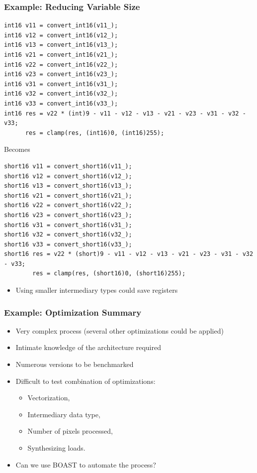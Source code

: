 \documentclass{beamer}
\begin{document}
\begin{frame}[fragile]
  \frametitle{Example: Reducing Variable Size}
\lstset{style=BC}
\begin{lstlisting}
int16 v11 = convert_int16(v11_);
int16 v12 = convert_int16(v12_);
int16 v13 = convert_int16(v13_);
int16 v21 = convert_int16(v21_);
int16 v22 = convert_int16(v22_);
int16 v23 = convert_int16(v23_);
int16 v31 = convert_int16(v31_);
int16 v32 = convert_int16(v32_);
int16 v33 = convert_int16(v33_);
int16 res = v22 * (int)9 - v11 - v12 - v13 - v21 - v23 - v31 - v32 - v33;
      res = clamp(res, (int16)0, (int16)255);
\end{lstlisting}
\centering Becomes
\begin{lstlisting}
short16 v11 = convert_short16(v11_);
short16 v12 = convert_short16(v12_);
short16 v13 = convert_short16(v13_);
short16 v21 = convert_short16(v21_);
short16 v22 = convert_short16(v22_);
short16 v23 = convert_short16(v23_);
short16 v31 = convert_short16(v31_);
short16 v32 = convert_short16(v32_);
short16 v33 = convert_short16(v33_);
short16 res = v22 * (short)9 - v11 - v12 - v13 - v21 - v23 - v31 - v32 - v33;
        res = clamp(res, (short16)0, (short16)255);
\end{lstlisting}
\begin{itemize}
\item Using smaller intermediary types could save registers
\end{itemize}
\end{frame}

\begin{frame}
  \frametitle{Example: Optimization Summary}
  \begin{itemize}
    \item Very complex process (several other optimizations could be applied)
    \item Intimate knowledge of the architecture required
    \item Numerous versions to be benchmarked
    \item Difficult to test combination of optimizations:
    \begin{itemize}
      \item Vectorization,
      \item Intermediary data type,
      \item Number of pixels processed,
      \item Synthesizing loads.
    \end{itemize}
    \item Can we use BOAST to automate the process?
  \end{itemize}
\end{frame}
\end{document}
